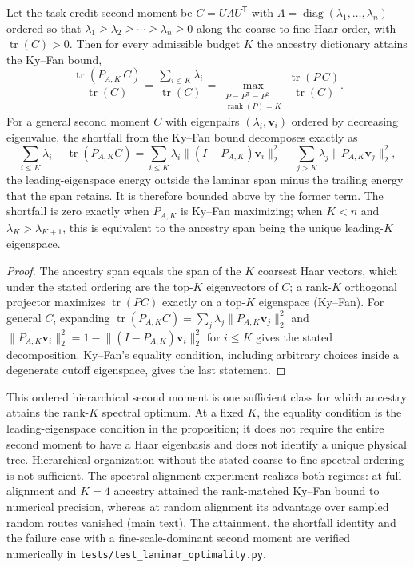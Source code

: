 \begin{proposition}
Let the task-credit second moment be $C=U\Lambda U^{\mathsf T}$ with
$\Lambda=\operatorname{diag}(\lambda_1,\dots,\lambda_n)$ ordered so that
$\lambda_1\geq\lambda_2\geq\cdots\geq\lambda_n\geq0$ along the
coarse-to-fine Haar order, with $\operatorname{tr}(C)>0$. Then for every admissible budget $K$ the
ancestry dictionary attains the Ky--Fan bound,
\begin{equation}
\frac{\operatorname{tr}(P_{A,K}\,C)}{\operatorname{tr}(C)}
=\frac{\sum_{i\leq K}\lambda_i}{\operatorname{tr}(C)}
=\max_{\substack{P=P^{\mathsf T}=P^2\\\operatorname{rank}(P)=K}}\frac{\operatorname{tr}(P\,C)}{\operatorname{tr}(C)} .
\end{equation}
For a general second moment $C$ with eigenpairs $(\lambda_i,\bm v_i)$ ordered
by decreasing eigenvalue, the shortfall from the Ky--Fan bound decomposes
exactly as
\begin{equation}
\sum_{i\leq K}\lambda_i-\operatorname{tr}(P_{A,K}C)
=\sum_{i\leq K}\lambda_i\lVert(I-P_{A,K})\bm v_i\rVert_2^2
-\sum_{j>K}\lambda_j\lVert P_{A,K}\bm v_j\rVert_2^2 ,
\end{equation}
the leading-eigenspace energy outside the laminar span minus the trailing
energy that the span retains. It is therefore bounded above by the former
term. The shortfall is zero exactly when $P_{A,K}$ is Ky--Fan maximizing;
when $K<n$ and $\lambda_K>\lambda_{K+1}$, this is equivalent to the ancestry span
being the unique leading-$K$ eigenspace.
\end{proposition}

\begin{proof}
The ancestry span equals the span of the $K$ coarsest Haar vectors, which
under the stated ordering are the top-$K$ eigenvectors of $C$; a rank-$K$
orthogonal projector maximizes $\operatorname{tr}(PC)$ exactly on a top-$K$ eigenspace
(Ky--Fan). For general $C$, expanding
$\operatorname{tr}(P_{A,K}C)=\sum_j\lambda_j\lVert P_{A,K}\bm v_j\rVert_2^2$
and $\lVert P_{A,K}\bm v_i\rVert_2^2=1-\lVert(I-P_{A,K})\bm v_i\rVert_2^2$
for $i\leq K$ gives the stated decomposition. Ky--Fan's equality condition,
including arbitrary choices inside a degenerate cutoff eigenspace, gives the
last statement.
\end{proof}

This ordered hierarchical second moment is one sufficient class for which
ancestry attains the rank-$K$ spectral optimum. At a fixed $K$, the equality
condition is the leading-eigenspace condition in the proposition; it does not
require the entire second moment to have a Haar eigenbasis and does not
identify a unique physical tree. Hierarchical organization without the stated
coarse-to-fine spectral ordering is not sufficient. The
spectral-alignment experiment realizes both regimes: at full alignment and
$K=4$ ancestry attained the rank-matched Ky--Fan bound to numerical
precision, whereas at random alignment its advantage over sampled random
routes vanished (main text). The attainment, the shortfall identity and
the failure case with a fine-scale-dominant second moment are verified
numerically in \texttt{tests/test\_laminar\_optimality.py}.

